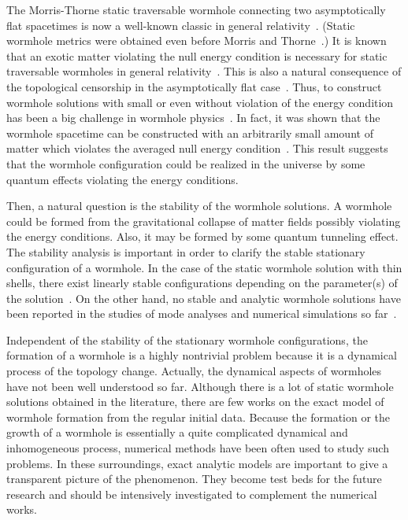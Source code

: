 \documentclass[aps,prd,twocolumn,eqsecnum,showpacs,amsmath]{revtex4}
\begin{document}
The Morris-Thorne static traversable wormhole connecting two asymptotically flat spacetimes is now a well-known classic in general relativity~\cite{mt1988}.
(Static wormhole metrics were obtained even before Morris and Thorne~\cite{before}.)
It is known that an exotic matter violating the null energy condition is necessary for static traversable wormholes in general relativity~\cite{visser,hv1997,negative}.
This is also a natural consequence of the topological censorship in the asymptotically flat case~\cite{TC}. 
Thus, to construct wormhole solutions with small or even without violation of the energy condition has been a big challenge in wormhole physics~\cite{bd,gb}.
In fact, it was shown that the wormhole spacetime can be constructed with an arbitrarily small amount of matter which violates the averaged null energy condition~\cite{vkd2003}.
This result suggests that the wormhole configuration could be realized in the universe by some quantum effects violating the energy conditions.

Then, a natural question is the stability of the wormhole solutions.
A wormhole could be formed from the gravitational collapse of matter fields possibly violating the energy conditions.
Also, it may be formed by some quantum tunneling effect.
The stability analysis is important in order to clarify the stable stationary configuration of a wormhole.
In the case of the static wormhole solution with thin shells, there exist linearly stable configurations depending on the parameter(s) of the solution~\cite{thin}. 
On the other hand, no stable and analytic wormhole solutions have been reported in the studies of mode analyses and numerical simulations so far~\cite{sh2002,a-p2002,ggs2008,bg2001}.

Independent of the stability of the stationary wormhole configurations, the formation of a wormhole is a highly nontrivial problem because it is a dynamical process of the topology change.
Actually, the dynamical aspects of wormholes have not been well understood so far.
Although there is a lot of static wormhole solutions obtained in the literature, there are few works on the exact model of wormhole formation from the regular initial data.
Because the formation or the growth of a wormhole is essentially a quite complicated dynamical and inhomogeneous process, numerical methods have been often used to study such problems.
In these surroundings, exact analytic models are important to give a transparent picture of the phenomenon.
They become test beds for the future research and should be intensively investigated to complement the numerical works.
\end{document}
